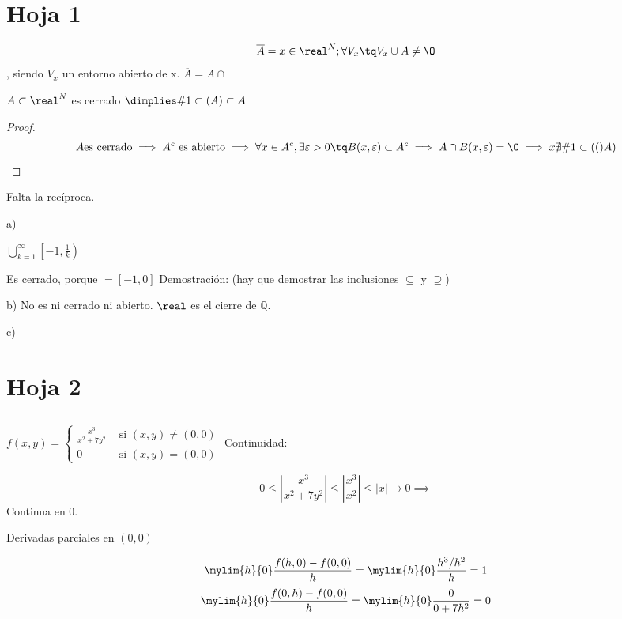 

\section{Hoja 1}

$$\overline{A} = { x \in \real^N; \forall V_x \tq V_x \cup A \neq \text{\O}}$$, siendo $V_x$ un entorno abierto de x.
	$\overline{A} = A \cap $ 
	
\begin{theorem}
$A \subset \real^N$ es cerrado $\dimplies \acum{A}\subset A$ 
\end{theorem}

 

\begin{proof}
$$A \text{es cerrado} \implies A^c \text{ es abierto} \implies \forall x \in A^c, \exists \varepsilon > 0 \tq B(x,\varepsilon) \subset A^c \implies A \cap B(x,\varepsilon) = \O \implies x \nexists \acum(A)$$
\end{proof}
Falta la recíproca.

\begin{problem}[3]

a)

$\displaystyle\bigcup_{k=1}^{\infty} \left[-1,\frac{1}{k}\right)$

Es cerrado, porque $=[-1,0]$
Demostración: (hay que demostrar las inclusiones $\subseteq$ y $\supseteq$)

b)
No es ni cerrado ni abierto.
\obs $\real$ es el cierre de $\mathbb{Q}$.

c)
 
\end{problem}

\newpage
\section{Hoja 2}

\subsection{}
$f(x,y) = \left\{\begin{matrix}
                \displaystyle \frac{x^3}{x^2+7y^2} & \text{ si } (x,y) \neq (0,0)\\
                 0 & \text{ si } (x,y) = (0,0)
                \end{matrix}\right.$
Continuidad:

$$0\leq \left| \frac{x^3}{x^2+7y^2} \right| \leq \left| \frac{x^3}{x^2} \right| \leq |x| \rightarrow 0 \implies$$ Continua en 0.

Derivadas parciales en $(0,0)$

$$\mylim{h}{0} \frac{f(h,0) - f(0,0)}{h} = \mylim{h}{0} \displaystyle\frac{{h^3}/{h^2}}{h} = 1$$
$$\mylim{h}{0} \frac{f(0,h) - f(0,0)}{h} = \mylim{h}{0} \frac{0}{0+7h^2} = 0$$
